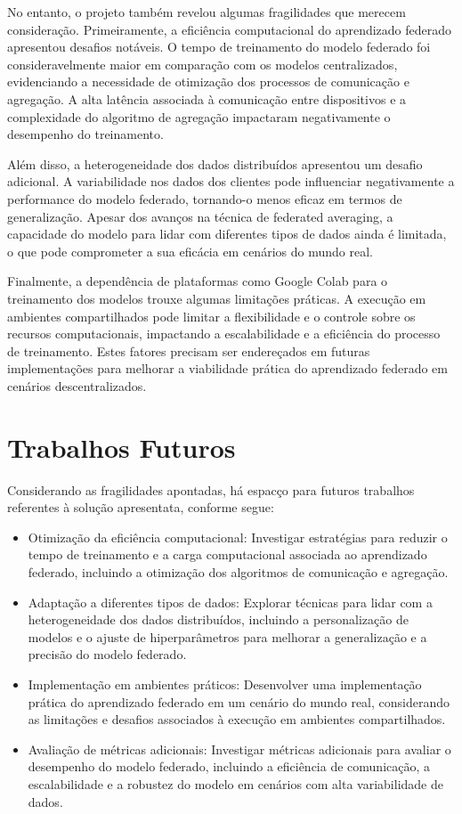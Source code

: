 No entanto, o projeto também revelou algumas fragilidades que merecem consideração. Primeiramente, a eficiência computacional do aprendizado federado apresentou desafios notáveis. O tempo de treinamento do modelo federado foi consideravelmente maior em comparação com os modelos centralizados, evidenciando a necessidade de otimização dos processos de comunicação e agregação. A alta latência associada à comunicação entre dispositivos e a complexidade do algoritmo de agregação impactaram negativamente o desempenho do treinamento.

Além disso, a heterogeneidade dos dados distribuídos apresentou um desafio adicional. A variabilidade nos dados dos clientes pode influenciar negativamente a performance do modelo federado, tornando-o menos eficaz em termos de generalização. Apesar dos avanços na técnica de federated averaging, a capacidade do modelo para lidar com diferentes tipos de dados ainda é limitada, o que pode comprometer a sua eficácia em cenários do mundo real.

Finalmente, a dependência de plataformas como Google Colab para o treinamento dos modelos trouxe algumas limitações práticas. A execução em ambientes compartilhados pode limitar a flexibilidade e o controle sobre os recursos computacionais, impactando a escalabilidade e a eficiência do processo de treinamento. Estes fatores precisam ser endereçados em futuras implementações para melhorar a viabilidade prática do aprendizado federado em cenários descentralizados.

\section{Trabalhos Futuros}
\label{sec:trabalhos-futuros}

Considerando as fragilidades apontadas, há espacço para futuros trabalhos referentes à solução apresentata, conforme segue:

\begin{itemize}
    \item Otimização da eficiência computacional: Investigar estratégias para reduzir o tempo de treinamento e a carga computacional associada ao aprendizado federado, incluindo a otimização dos algoritmos de comunicação e agregação.
    \item Adaptação a diferentes tipos de dados: Explorar técnicas para lidar com a heterogeneidade dos dados distribuídos, incluindo a personalização de modelos e o ajuste de hiperparâmetros para melhorar a generalização e a precisão do modelo federado.
    \item Implementação em ambientes práticos: Desenvolver uma implementação prática do aprendizado federado em um cenário do mundo real, considerando as limitações e desafios associados à execução em ambientes compartilhados.
    \item Avaliação de métricas adicionais: Investigar métricas adicionais para avaliar o desempenho do modelo federado, incluindo a eficiência de comunicação, a escalabilidade e a robustez do modelo em cenários com alta variabilidade de dados.
\end{itemize}